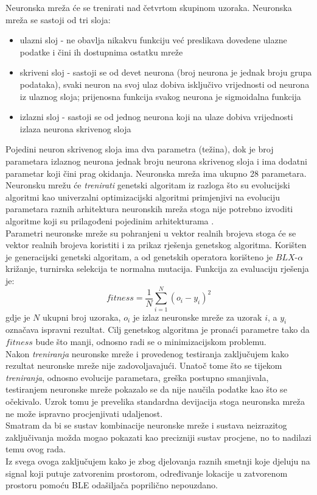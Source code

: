 Neuronska mreža će se trenirati nad četvrtom skupinom uzoraka. 
Neuronska mreža se sastoji od tri sloja:
\begin{itemize}
 \item ulazni sloj - ne obavlja nikakvu funkciju već preslikava dovedene ulazne podatke i čini ih dostupnima ostatku mreže
 \item skriveni sloj - sastoji se od devet neurona (broj neurona je jednak broju grupa podataka), svaki neuron na svoj ulaz dobiva isključivo vrijednosti od neurona iz ulaznog sloja; prijenosna funkcija svakog neurona je sigmoidalna funkcija
 \item izlazni sloj - sastoji se od jednog neurona koji na ulaze dobiva vrijednosti izlaza neurona skrivenog sloja
\end{itemize}
Pojedini neuron skrivenog sloja ima dva parametra (težina), dok je broj parametara izlaznog neurona jednak broju neurona skrivenog sloja i ima dodatni parametar koji čini prag okidanja. 
Neuronska mreža ima ukupno 28 parametara.
\\

Neuronsku mrežu će \textit{trenirati} genetski algoritam iz razloga što su evolucijski algoritmi kao univerzalni optimizacijski algoritmi primjenjivi na evoluciju parametara raznih arhitektura neuronskih mreža stoga nije potrebno izvoditi algoritme koji su prilagođeni pojedinim arhitekturama \citep{nenr}.
\\
Parametri neuronske mreže su pohranjeni u vektor realnih brojeva stoga će se vektor realnih brojeva koristiti i za prikaz rješenja genetskog algoritma. 
Korišten je generacijski genetski algoritam, a od genetskih operatora korišteno je $BLX\text{-}\alpha$ križanje, turnirska selekcija te normalna mutacija. 
Funkcija za evaluaciju rješenja je:
\begin{equation}
    fitness = \frac{1}{N}\sum_{i=1}^{N}{(o_i - y_i)^2}
\end{equation}
gdje je $N$ ukupni broj uzoraka, $o_i$ je izlaz neuronske mreže za uzorak $i$, a $y_i$ označava ispravni rezultat. 
Cilj genetskog algoritma je pronaći parametre tako da $fitness$ bude što manji, odnosno radi se o minimizacijskom problemu.
\\

Nakon \textit{treniranja} neuronske mreže i provedenog testiranja zaključujem kako rezultat neuronske mreže nije zadovoljavajući. 
Unatoč tome što se tijekom \textit{treniranja}, odnosno evolucije parametara, greška postupno smanjivala, testiranjem neuronske mreže pokazalo se da nije naučila podatke kao što se očekivalo. 
Uzrok tomu je prevelika standardna devijacija stoga neuronska mreža ne može ispravno procjenjivati udaljenost.
\\
Smatram da bi se sustav kombinacije neuronske mreže i sustava neizrazitog zaključivanja možda mogao pokazati kao precizniji sustav procjene, no to nadilazi temu ovog rada.
\\
Iz svega ovoga zaključujem kako je zbog djelovanja raznih smetnji koje djeluju na signal koji putuje zatvorenim prostorom, određivanje lokacije u zatvorenom prostoru pomoću BLE odašiljača poprilično nepouzdano.

